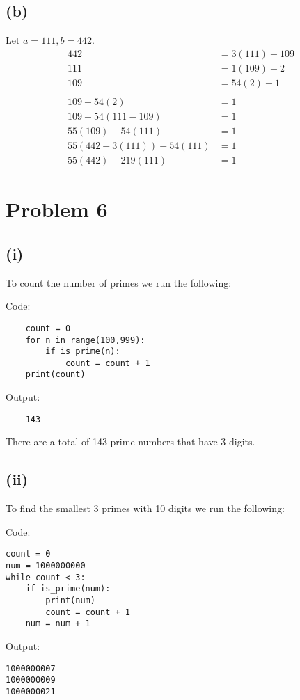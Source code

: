 \documentclass{article}
\theoremstyle{definition}
\begin{document}
\subsection*{(b)}
Let $a = 111, b=442$.
\begin{align*}
    442 &= 3(111) + 109 \\
    111 &= 1(109) + 2 \\
    109 &= 54(2) + 1 \\\\
    109 - 54(2) & = 1 \\
    109 - 54(111 - 109) & = 1\\
    55(109) - 54(111) &= 1\\
    55(442 - 3(111)) - 54(111) &= 1\\
    55(442) -219(111) &= 1
\end{align*}
\section*{Problem 6}
\subsection*{(i)}
To count the number of primes we run the following:
\begin{mdframed}
Code:
\begin{verbatim}
    count = 0
    for n in range(100,999):
        if is_prime(n):
            count = count + 1
    print(count)
    \end{verbatim}
Output:
\begin{verbatim}
    143
\end{verbatim}
\end{mdframed}
There are a total of 143 prime numbers that have 3 digits.
\subsection*{(ii)}
To find the smallest 3 primes with 10 digits we run the following:
\begin{mdframed}
    Code:
    \begin{verbatim}
count = 0
num = 1000000000
while count < 3:
    if is_prime(num):
        print(num)
        count = count + 1
    num = num + 1
    \end{verbatim}
    Output:
    \begin{verbatim}
1000000007
1000000009
1000000021
    \end{verbatim}
\end{mdframed}
\end{document}

